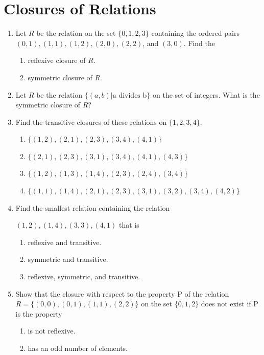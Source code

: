 \documentclass{sig-alternate-05-2015}
\begin{document}
\section{Closures of Relations}
\begin{enumerate}
\item Let $R$ be the relation on the set $\{0, 1, 2, 3\}$ containing the ordered pairs $(0, 1), (1, 1), (1, 2), (2, 0), (2, 2)$, and $(3, 0)$. Find the
	\begin{enumerate}
		\item reflexive closure of $R$.
		\item symmetric closure of $R$.
	\end{enumerate}

\item Let $R$ be the relation $\{(a, b) | \text{a divides b}\}$ on the set of
integers. What is the symmetric closure of $R$?
	
\item Find the transitive closures of these relations on $\{1, 2, 3, 4\}$.
	\begin{enumerate}
		\item $\{(1, 2), (2,1), (2,3), (3,4), (4,1)\}$
		\item $\{(2, 1), (2,3), (3,1), (3,4), (4,1), (4, 3)\}$
		\item $\{(1, 2), (1,3), (1,4), (2,3), (2,4), (3, 4)\}$
		\item $\{(1, 1), (1,4), (2,1), (2,3), (3,1), (3, 2), (3,4), (4, 2)\}$
	\end{enumerate}
	
\item Find the smallest relation containing the relation
	
	${(1, 2), (1, 4), (3, 3), (4, 1)}$ that is
	\begin{enumerate}
		\item reflexive and transitive.
		\item symmetric and transitive.
		\item reflexive, symmetric, and transitive.
	\end{enumerate}
	
\item Show that the closure with respect to the property P of
the relation $R = \{(0, 0), (0, 1), (1, 1), (2, 2)\}$ on the set
$\{0, 1, 2\}$ does not exist if P is the property
	\begin{enumerate}
		\item is not reflexive.
		\item has an odd number of elements.
	\end{enumerate}
\end{enumerate}
\end{document}
